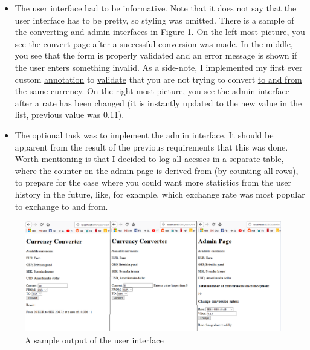 \documentclass[a4paper]{scrartcl}
\begin{document}
\begin{itemize}
    \item The user interface had to be informative. Note that it does not say that the user interface has to be pretty, so styling was omitted. There is a sample of the converting and admin interfaces in Figure 1. On the left-most picture, you see the convert page after a successful conversion was made. In the middle, you see that the form is properly validated and an error message is shown if the user enters something invalid. As a side-note, I implemented my first ever custom \href{https://github.com/fongie/CurrencyConverter/blob/master/currencyconverter/src/main/java/se/kth/korlinge/currencyconverter/presentation/conversion/UniqueToAndFrom.java}{annotation} to \href{https://github.com/fongie/CurrencyConverter/blob/master/currencyconverter/src/main/java/se/kth/korlinge/currencyconverter/presentation/conversion/UniqueToAndFromValidator.java}{validate} that you are not trying to convert \href{https://github.com/fongie/CurrencyConverter/blob/master/currencyconverter/src/main/java/se/kth/korlinge/currencyconverter/presentation/conversion/ConversionRequest.java#L10}{to and from} the same currency. On the right-most picture, you see the admin interface after a rate has been changed (it is instantly updated to the new value in the list, previous value was 0.11).

    \item The optional task was to implement the admin interface. It should be apparent from the result of the previous requirements that this was done. Worth mentioning is that I decided to log all acesses in a separate table, where the counter on the admin page is derived from (by counting all rows), to prepare for the case where you could want more statistics from the user history in the future, like, for example, which exchange rate was most popular to exchange to and from.

\end{itemize}

\begin{figure}[h!]
    \begin{center}
        \includegraphics[scale=0.52]{ui.png}
        \caption{A sample output of the user interface}
        \label{fig:ui}
    \end{center}
\end{figure}
\end{document}
